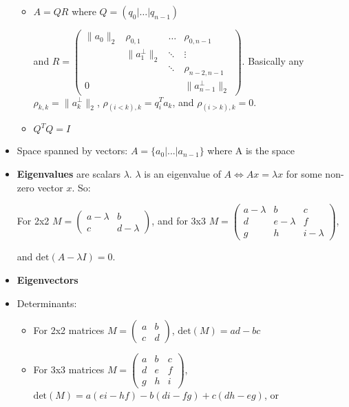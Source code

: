 \documentclass[a4paper]{article}
\begin{document}
\begin{itemize}
\begin{itemize}
                \item \(A=QR\) where \(Q=(q_0 | \dots | q_{n-1})\)

                	and \(R=
                		\begin{pmatrix}
                    	\parallel a_0 \parallel _2 & \rho _{0,1} & \dots & \rho _{0,n-1} \\
                        & \parallel a_1^{\bot } \parallel _2 & \ddots & \vdots \\
                        & & \ddots & \rho _{n-2,n-1} \\
                        0 & & & \parallel a^{\bot }_{n-1} \parallel _2
                    	\end{pmatrix}
                	\). Basically any \(\rho _{k,k}=\parallel a_k^{\bot } \parallel _2 \),
                	\(\rho _{(i<k),k}=q_i^Ta_k\), and \(\rho _{(i>k),k}=0\).
                \item \(Q^TQ=I\)
			\end{itemize}
		\item Space spanned by vectors: \(A=\{ a_0|\text{...}|a_{n−1}\} \) where A is the space
        \item \textbf{Eigenvalues} are scalars \(\lambda \). \(\lambda\) is an eigenvalue of \(A \iff Ax = \lambda x\) for some non-zero vector \(x\). So:

        	For 2x2 \(M =
                \begin{pmatrix}
                    a-\lambda & b \\
                    c & d-\lambda
                \end{pmatrix}\), and for 3x3 \( M =
                \begin{pmatrix}
                    a-\lambda & b & c \\
                    d & e-\lambda & f \\
                    g & h & i-\lambda
                \end{pmatrix} \),

            and \( \text{det}(A-\lambda I)=0\).
        \item \textbf{Eigenvectors}
        \item Determinants:
        	\begin{itemize}
        		\item For 2x2 matrices
                	\(M =
                    \begin{pmatrix}
                		a & b \\
                        c & d
                	\end{pmatrix}\),
                    \(\text{det}(M)=ad-bc \)
                \item For 3x3 matrices
                	\(M =
                    \begin{pmatrix}
                		a & b & c \\
                        d & e & f \\
                        g & h & i
                	\end{pmatrix}\),
                    \(\text{det}(M)= a(ei-hf)-b(di-fg)+c(dh-eg) \), or


\end{itemize}
\end{itemize}
\end{document}
